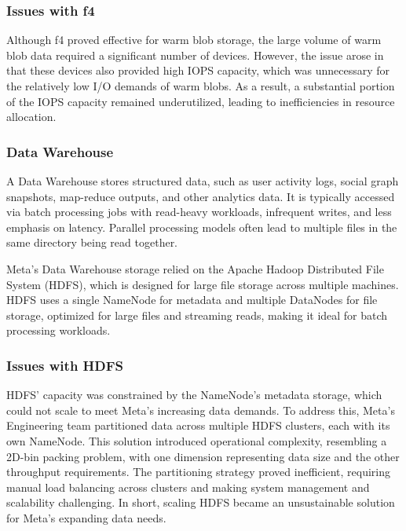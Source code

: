 \subsubsection*{Issues with f4}\label{sec:f4_issues}
Although f4 proved effective for warm blob storage, the large volume of warm blob data required a significant number of devices. However, the issue arose in that these devices also provided high IOPS capacity, which was unnecessary for the relatively low I/O demands of warm blobs. As a result, a substantial portion of the IOPS capacity remained underutilized, leading to inefficiencies in resource allocation.


\subsubsection{Data Warehouse}\label{sec:data_warehouse}
A Data Warehouse stores structured data, such as user activity logs, social graph snapshots, map-reduce outputs, and other analytics data. It is typically accessed via batch processing jobs with read-heavy workloads, infrequent writes, and less emphasis on latency. Parallel processing models often lead to multiple files in the same directory being read together.

Meta's Data Warehouse storage relied on the Apache Hadoop Distributed File System (HDFS)\cite{hdfs}, which is designed for large file storage across multiple machines. HDFS uses a single NameNode for metadata and multiple DataNodes for file storage, optimized for large files and streaming reads, making it ideal for batch processing workloads.


\subsubsection*{Issues with HDFS}\label{sec:hdfs_issues}
HDFS' capacity was constrained by the NameNode's metadata storage, which could not scale to meet Meta's increasing data demands. To address this, Meta's Engineering team partitioned data across multiple HDFS clusters, each with its own NameNode. This solution introduced operational complexity, resembling a 2D-bin packing problem, with one dimension representing data size and the other throughput requirements. The partitioning strategy proved inefficient, requiring manual load balancing across clusters and making system management and scalability challenging. In short, scaling HDFS became an unsustainable solution for Meta's expanding data needs.


